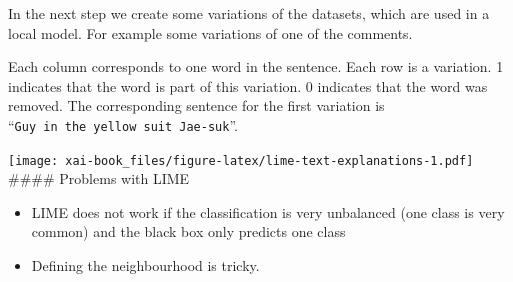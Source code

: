\documentclass[12pt,]{krantz}
\providecommand{\tightlist}{%
  \setlength{\itemsep}{0pt}\setlength{\parskip}{0pt}}
\theoremstyle{definition}
\theoremstyle{definition}
\theoremstyle{definition}
\theoremstyle{remark}
\begin{document}
In the next step we create some variations of the datasets, which are
used in a local model. For example some variations of one of the
comments.

\hypertarget{htmlwidget-aa0035eeecbb5583be9e}{}

Each column corresponds to one word in the sentence. Each row is a
variation. 1 indicates that the word is part of this variation. 0
indicates that the word was removed. The corresponding sentence for the
first variation is ``\texttt{Guy\ in\ the\ yellow\ suit\ Jae-suk}''.

\texttt{[image: xai-book\_files/figure-latex/lime-text-explanations-1.pdf]}
\#\#\#\# Problems with LIME

\begin{itemize}
\tightlist
\item
  LIME does not work if the classification is very unbalanced (one class
  is very common) and the black box only predicts one class
\item
  Defining the neighbourhood is tricky.
\end{itemize}



\backmatter
\end{document}
